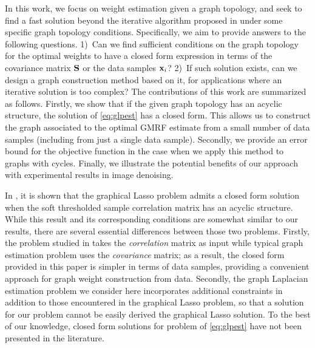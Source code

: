 \documentclass{article}
\begin{document}
% 
% 
In this work, we focus on weight estimation given a graph topology, and seek to find a fast solution beyond the iterative algorithm proposed in \cite{Egilmez2017} under some specific graph topology conditions. Specifically, we aim to provide answers to the following questions. 1)~Can we find sufficient conditions on the graph topology for the  optimal weights to have a closed form expression in terms of the covariance matrix ${\bf S}$ or the data samples ${\bf x}_i$? 2)~If such solution exists, can we design a graph construction method based on it, for applications where an iterative solution is too complex? The contributions of this work are summarized as follows. Firstly, we show that if the given graph topology has an acyclic structure, the solution of \eqref{eq:glpest} has a closed form. This allows us to construct the graph associated to the optimal GMRF estimate from a small number of  data samples (including from just a single data sample). Secondly, we provide an error bound for the objective function in the case when we apply this method to graphs with cycles. Finally, we illustrate the potential benefits of our approach with  experimental results in image denoising. 

In \cite{Fattahi2017}, it is shown that the graphical Lasso problem \cite{Friedman2008} admits a closed form solution when the soft thresholded sample correlation matrix has an acyclic structure. While this result and its corresponding conditions are somewhat similar to our results, there are several essential differences between those two problems. Firstly, the problem studied in \cite{Fattahi2017} takes the {\it correlation} matrix as input while typical graph estimation problem uses the {\it covariance} matrix; as a result, the closed form provided in this paper is simpler in terms of data samples, providing a convenient approach for graph weight construction from data. Secondly, the graph Laplacian estimation problem we consider here incorporates additional constraints in addition to those encountered in the graphical Lasso problem, so that a solution for our problem cannot be easily derived the graphical Lasso solution. To the best of our knowledge, closed form solutions for problem of \eqref{eq:glpest} have not been presented in the literature.
\end{document}
